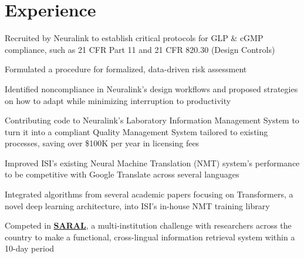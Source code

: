 \documentclass[letterpaper]{deedy-resume} %
\begin{document}
\begin{minipage}[t]{0.66\textwidth} %


\section{Experience}

\vspace{\topsep} %
\vspace{\topsep}

\begin{tightitemize}
\item Recruited by Neuralink to establish critical protocols for GLP \& cGMP compliance, such as 21 CFR Part 11 and 21 CFR 820.30 (Design Controls)
\item Formulated a procedure for formalized, data-driven risk assessment
\item Identified noncompliance in Neuralink's design workflows and proposed strategies on how to adapt while minimizing interruption to productivity
\item Contributing code to Neuralink's Laboratory Information Management System to turn it into a compliant Quality Management System tailored to existing processes, saving over \$100K per year in licensing fees
\end{tightitemize}

\sectionspace %


\vspace{\topsep}

\begin{tightitemize}
\item Improved ISI's existing Neural Machine Translation (NMT) system’s performance to be competitive with Google Translate across several languages
\item Integrated algorithms from several academic papers focusing on Transformers, a novel deep learning architecture, into ISI’s in-house NMT training library 
\item Competed in \href{https://viterbischool.usc.edu/news/2018/01/usc-isi-develop-translation-information-retrieval-system-uncommon-languages/}{\bf SARAL}, a multi-institution challenge with researchers across the country to make a functional, cross-lingual information retrieval system within a 10-day period


\end{tightitemize}
\end{minipage}
\end{document}
